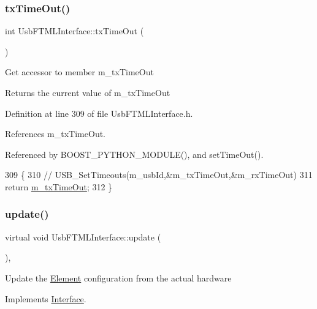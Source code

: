 \subsubsection{\texorpdfstring{tx\+Time\+Out()}{txTimeOut()}}
{\footnotesize\ttfamily int Usb\+F\+T\+M\+L\+Interface\+::tx\+Time\+Out (\begin{DoxyParamCaption}{ }\end{DoxyParamCaption})\hspace{0.3cm}{\ttfamily [inline]}}

Get accessor to member m\+\_\+tx\+Time\+Out \begin{DoxyReturn}{Returns}
the current value of m\+\_\+tx\+Time\+Out 
\end{DoxyReturn}


Definition at line 309 of file Usb\+F\+T\+M\+L\+Interface.\+h.



References m\+\_\+tx\+Time\+Out.



Referenced by B\+O\+O\+S\+T\+\_\+\+P\+Y\+T\+H\+O\+N\+\_\+\+M\+O\+D\+U\+L\+E(), and set\+Time\+Out().


\begin{DoxyCode}
309                    \{
310     \textcolor{comment}{//    USB\_SetTimeouts(m\_usbId,&m\_txTimeOut,&m\_rxTimeOut)}
311     \textcolor{keywordflow}{return} \hyperlink{classUsbFTMLInterface_a48cd0df4e1d8fd53d96b208b5b9c7061}{m\_txTimeOut};
312   \}  
\end{DoxyCode}
\mbox{\label{classUsbFTMLInterface_a941ba5a5c0f398e5d26c97bb4111510d}} 
\subsubsection{\texorpdfstring{update()}{update()}}
{\footnotesize\ttfamily virtual void Usb\+F\+T\+M\+L\+Interface\+::update (\begin{DoxyParamCaption}{ }\end{DoxyParamCaption})\hspace{0.3cm}{\ttfamily [inline]}, {\ttfamily [virtual]}}

Update the \hyperlink{classElement}{Element} configuration from the actual hardware 

Implements \hyperlink{classInterface_a30e71ffbe36091df9f7c0838dd4b60d2}{Interface}.



